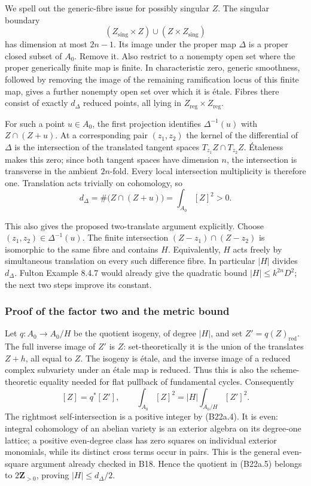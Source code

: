 We spell out the generic-fibre issue for possibly singular \(Z\). The singular boundary \[
 (Z_{\mathrm{sing}}\times Z)\cup(Z\times Z_{\mathrm{sing}})
\] has dimension at most \(2n-1\). Its image under the proper map \(\Delta\) is a proper closed subset of \(A_0\). Remove it. Also restrict to a nonempty open set where the proper generically finite map is finite. In characteristic zero, generic smoothness, followed by removing the image of the remaining ramification locus of this finite map, gives a further nonempty open set over which it is étale. Fibres there consist of exactly \(d_\Delta\) reduced points, all lying in \(Z_{\mathrm{reg}}\times Z_{\mathrm{reg}}\).

For such a point \(u\in A_0\), the first projection identifies \(\Delta^{-1}(u)\) with \(Z\cap(Z+u)\). At a corresponding pair \((z_1,z_2)\) the kernel of the differential of \(\Delta\) is the intersection of the translated tangent spaces \(T_{z_1}Z\cap T_{z_2}Z\). Étaleness makes this zero; since both tangent spaces have dimension \(n\), the intersection is transverse in the ambient \(2n\)-fold. Every local intersection multiplicity is therefore one. Translation acts trivially on cohomology, so \[
 d_\Delta=\#\bigl(Z\cap(Z+u)\bigr)=\int_{A_0}[Z]^2>0.
\tag{B22a.4}
\]

This also gives the proposed two-translate argument explicitly. Choose \((z_1,z_2)\in\Delta^{-1}(u)\). The finite intersection \((Z-z_1)\cap(Z-z_2)\) is isomorphic to the same fibre and contains \(H\). Equivalently, \(H\) acts freely by simultaneous translation on every such difference fibre. In particular \(|H|\) divides \(d_\Delta\). Fulton Example 8.4.7 would already give the quadratic bound \(|H|\le k^{2n}D^2\); the next two steps improve its constant.

\subsubsection{Proof of the factor two and the metric bound}\label{proof-of-the-factor-two-and-the-metric-bound}

Let \(q:A_0\to A_0/H\) be the quotient isogeny, of degree \(|H|\), and set \(Z'=q(Z)_{\mathrm{red}}\). The full inverse image of \(Z'\) is \(Z\): set-theoretically it is the union of the translates \(Z+h\), all equal to \(Z\). The isogeny is étale, and the inverse image of a reduced complex subvariety under an étale map is reduced. Thus this is also the scheme-theoretic equality needed for flat pullback of fundamental cycles. Consequently \[
 [Z]=q^*[Z'],\qquad
 \int_{A_0}[Z]^2=|H|\int_{A_0/H}[Z']^2.
\tag{B22a.5}
\] The rightmost self-intersection is a positive integer by (B22a.4). It is even: integral cohomology of an abelian variety is an exterior algebra on its degree-one lattice; a positive even-degree class has zero squares on individual exterior monomials, while its distinct cross terms occur in pairs. This is the general even-square argument already checked in B18. Hence the quotient in (B22a.5) belongs to \(2\mathbf Z_{>0}\), proving \(|H|\le d_\Delta/2\).

